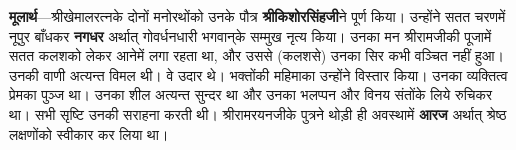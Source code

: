 \begin{sloppypar}\justifying{}
\textbf{मूलार्थ}—श्रीखेमालरत्नके दोनों मनोरथोंको उनके पौत्र \textbf{श्रीकिशोरसिंहजी}ने पूर्ण किया। उन्होंने सतत चरणमें नूपुर बाँधकर \textbf{नगधर} अर्थात् गोवर्धनधारी भगवान्‌के सम्मुख नृत्य किया। उनका मन श्रीरामजीकी पूजामें सतत कलशको लेकर आनेमें लगा रहता था, और उससे (कलशसे) उनका सिर कभी वञ्चित नहीं हुआ। उनकी वाणी अत्यन्त विमल थी। वे उदार थे। भक्तोंकी महिमाका उन्होंने विस्तार किया। उनका व्यक्तित्व प्रेमका पुञ्ज था। उनका शील अत्यन्त सुन्दर था और उनका भलप्पन और विनय संतोंके लिये रुचिकर था। सभी सृष्टि उनकी सराहना करती थी। श्रीरामरयनजीके पुत्रने थोड़ी ही अवस्थामें \textbf{आरज} अर्थात् श्रेष्ठ लक्षणोंको स्वीकार कर लिया था।
\end{sloppypar}


